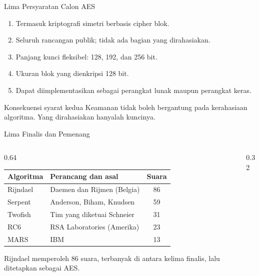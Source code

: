 \documentclass[aspectratio=169,11pt]{beamer}
\begin{document}
\begin{frame}{Lima Persyaratan Calon AES}
    \footnotesize
    \begin{enumerate}
        \item Termasuk kriptografi simetri berbasis cipher blok.
        \item Seluruh rancangan publik; tidak ada bagian yang
              dirahasiakan.
        \item Panjang kunci fleksibel: 128, 192, dan 256 bit.
        \item Ukuran blok yang dienkripsi 128 bit.
        \item Dapat diimplementasikan sebagai perangkat lunak maupun
              perangkat keras.
    \end{enumerate}
    \vspace{0.2cm}
    \begin{alertblock}{Konsekuensi syarat kedua}
        \footnotesize
        Keamanan tidak boleh bergantung pada kerahasiaan algoritma.
        Yang dirahasiakan hanyalah kuncinya.
    \end{alertblock}
\end{frame}

\begin{frame}{Lima Finalis dan Pemenang}
    \footnotesize
    \begin{columns}[T,onlytextwidth]
        \begin{column}{0.64\textwidth}
            \begin{tabularx}{\linewidth}{@{}l >{\raggedright\arraybackslash}X c@{}}
                \toprule
                \textbf{Algoritma} & \textbf{Perancang dan asal} & \textbf{Suara} \\
                \midrule
                Rijndael & Daemen dan Rijmen (Belgia) & 86 \\
                Serpent & Anderson, Biham, Knudsen & 59 \\
                Twofish & Tim yang diketuai Schneier & 31 \\
                RC6 & RSA Laboratories (Amerika) & 23 \\
                MARS & IBM & 13 \\
                \bottomrule
            \end{tabularx}
            \vspace{0.15cm}
            Rijndael memperoleh 86 suara, terbanyak di antara kelima
            finalis, lalu ditetapkan sebagai AES.
        \end{column}
        \begin{column}{0.32\textwidth}
            \centering
        \end{column}
    \end{columns}
\end{frame}
\end{document}
